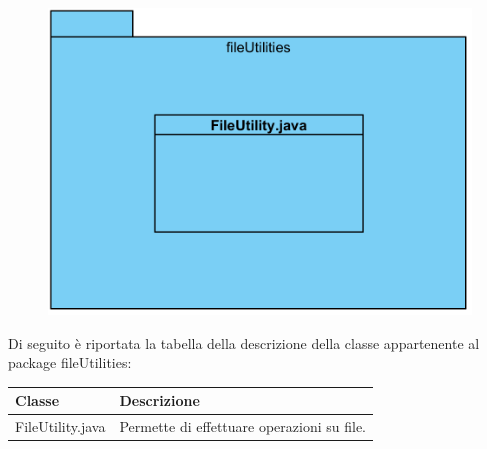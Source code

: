 \documentclass[11pt]{article}
\begin{document}
\begin{description}
				\item[ 2.1.1.2.4 Package fileUtilities] 
				\item \begin{figure}[!h]
					\centering					\includegraphics{diagrams/FileUtilityPackageDiagram}
				\end{figure}
				Di seguito è riportata la tabella della descrizione della classe appartenente al package fileUtilities:
				\item \begin{tabular}{|p{}|p{}|}
					\hline
					\textbf{Classe} & \textbf{Descrizione}\\
					\hline
					FileUtility.java & Permette di effettuare operazioni su file. \\
					\hline
				\end{tabular}
				

\end{description}
\end{document}
